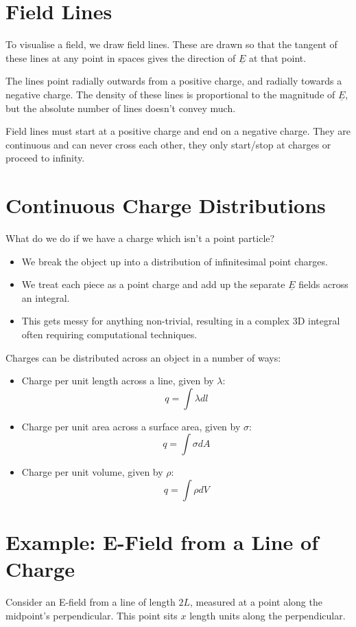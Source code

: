 
\section{Field Lines}
To visualise a field, we draw field lines. These are drawn so that the tangent of these lines at any point in spaces gives the direction of $\underline{E}$ at that point.

The lines point radially outwards from a positive charge, and radially towards a negative charge. The density of these lines is proportional to the magnitude of $\underline{E}$, but the absolute number of lines doesn't convey much.

Field lines must start at a positive charge and end on a negative charge. They are continuous and can never cross each other, they only start/stop at charges or proceed to infinity.

\section{Continuous Charge Distributions}
What do we do if we have a charge which isn't a point particle? 
\begin{itemize}
    \item We break the object up into a distribution of infinitesimal point charges.
    \item We treat each piece as a point charge and add up the separate $\underline{E}$ fields across an integral.
    \item This gets messy for anything non-trivial, resulting in a complex 3D integral often requiring computational techniques.
\end{itemize}

Charges can be distributed across an object in a number of ways:
\begin{itemize}
    \item Charge per unit length across a line, given by $\lambda$:
    \[
        q = \int \lambda dl
    \]
    \item Charge per unit area across a surface area, given by $\sigma$:
    \[
        q = \int \sigma dA
    \]

    \item Charge per unit volume, given by $\rho$:
    \[
        q = \int \rho dV
    \]    
\end{itemize}

\section{Example: E-Field from a Line of Charge}
Consider an E-field from a line of length $2L$, measured at a point along the midpoint's perpendicular. This point sits $x$ length units along the perpendicular.

